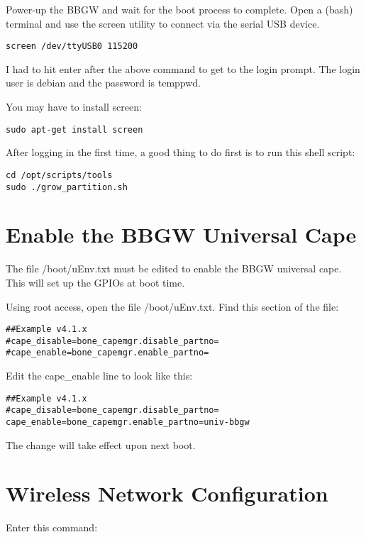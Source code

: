 Power-up the BBGW and wait for the boot process to complete.
Open a (bash) terminal and use the screen utility to connect via the serial USB 
device.

\begin{verbatim}
screen /dev/ttyUSB0 115200
\end{verbatim}

I had to hit enter after the above command to get to the login prompt.
The login user is debian and the password is temppwd.

You may have to install screen:

\begin{verbatim}
sudo apt-get install screen
\end{verbatim}

After logging in the first time, a good thing to do first is to run this shell 
script:

\begin{verbatim}
cd /opt/scripts/tools
sudo ./grow_partition.sh
\end{verbatim}

\section{Enable the BBGW Universal Cape}

The file /boot/uEnv.txt must be edited to enable the BBGW universal cape.  This 
will set up the GPIOs at boot time.

Using root access, open the file /boot/uEnv.txt.
Find this section of the file:

\begin{verbatim}
##Example v4.1.x
#cape_disable=bone_capemgr.disable_partno=
#cape_enable=bone_capemgr.enable_partno=
\end{verbatim}

Edit the cape\_enable line to look like this:

\begin{verbatim}
##Example v4.1.x
#cape_disable=bone_capemgr.disable_partno=
cape_enable=bone_capemgr.enable_partno=univ-bbgw
\end{verbatim}

The change will take effect upon next boot.

\section{Wireless Network Configuration}

Enter this command:

